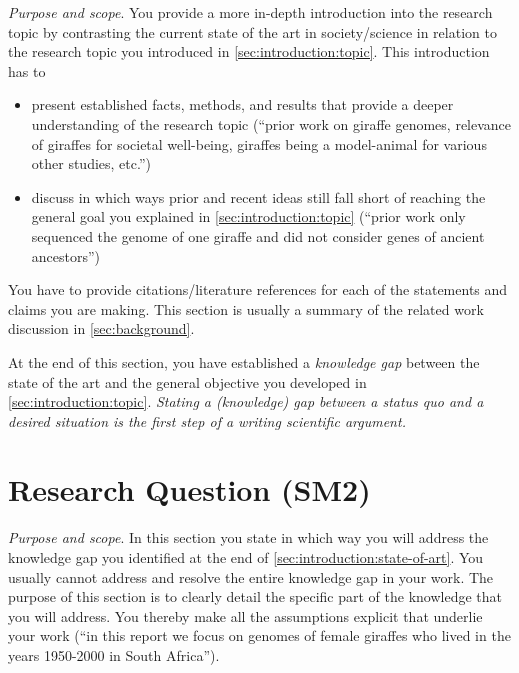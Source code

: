 \documentclass[
  fontsize=10pt
  numbers=noenddot,
  english,  %
  paper=a5,
  twoside,  %
  DIV=calc,
  headings=small,
  bibliography=totoc,
  listof=totoc,
  draft=false
]{scrbook}
\theoremstyle{break}
\begin{document}
\emph{Purpose and scope}. You provide a more in-depth introduction into the research topic by contrasting the current state of the art in society/science in relation to the research topic you introduced in \cref{sec:introduction:topic}. This introduction has to

\begin{itemize}
    \item present established facts, methods, and results that provide a deeper understanding of the research topic (``prior work on giraffe genomes, relevance of giraffes for societal well-being, giraffes being a model-animal for various other studies, etc.'')
    \item discuss in which ways prior and recent ideas still fall short of reaching the general goal you explained in \cref{sec:introduction:topic} (``prior work only sequenced the genome of one giraffe and did not consider genes of ancient ancestors'')
\end{itemize}

You have to provide citations/literature references for each of the statements and claims you are making. This section is usually a summary of the related work discussion in \cref{sec:background}.

At the end of this section, you have established a \emph{knowledge gap} between the state of the art and the general objective you developed in \cref{sec:introduction:topic}. \emph{Stating a (knowledge) gap between a status quo and a desired situation is the \emph{first step} of a writing scientific argument.}


\section{Research Question (SM2)}\label{sec:introduction:research-question}

\emph{Purpose and scope}. In this section you state in which way you will address the knowledge gap you identified at the end of \cref{sec:introduction:state-of-art}. You usually cannot address and resolve the entire knowledge gap in your work. The purpose of this section is to clearly detail the specific part of the knowledge that you will address. You thereby make all the assumptions explicit that underlie your work (``in this report we focus on genomes of female giraffes who lived in the years 1950-2000 in South Africa'').
\end{document}
